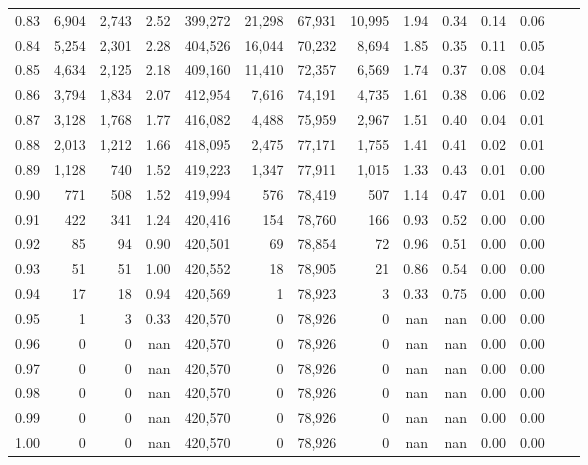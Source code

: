 \begin{tabular}{rrrrrrrrrrrrrr}
0.83 &   6,904 &  2,743 &    2.52 &  399,272 &   21,298 &  67,931 &  10,995 &  1.94 &  0.34 &  0.14 &      0.06 \\
0.84 &   5,254 &  2,301 &    2.28 &  404,526 &   16,044 &  70,232 &   8,694 &  1.85 &  0.35 &  0.11 &      0.05 \\
0.85 &   4,634 &  2,125 &    2.18 &  409,160 &   11,410 &  72,357 &   6,569 &  1.74 &  0.37 &  0.08 &      0.04 \\
0.86 &   3,794 &  1,834 &    2.07 &  412,954 &    7,616 &  74,191 &   4,735 &  1.61 &  0.38 &  0.06 &      0.02 \\
0.87 &   3,128 &  1,768 &    1.77 &  416,082 &    4,488 &  75,959 &   2,967 &  1.51 &  0.40 &  0.04 &      0.01 \\
0.88 &   2,013 &  1,212 &    1.66 &  418,095 &    2,475 &  77,171 &   1,755 &  1.41 &  0.41 &  0.02 &      0.01 \\
0.89 &   1,128 &    740 &    1.52 &  419,223 &    1,347 &  77,911 &   1,015 &  1.33 &  0.43 &  0.01 &      0.00 \\
0.90 &     771 &    508 &    1.52 &  419,994 &      576 &  78,419 &     507 &  1.14 &  0.47 &  0.01 &      0.00 \\
0.91 &     422 &    341 &    1.24 &  420,416 &      154 &  78,760 &     166 &  0.93 &  0.52 &  0.00 &      0.00 \\
0.92 &      85 &     94 &    0.90 &  420,501 &       69 &  78,854 &      72 &  0.96 &  0.51 &  0.00 &      0.00 \\
0.93 &      51 &     51 &    1.00 &  420,552 &       18 &  78,905 &      21 &  0.86 &  0.54 &  0.00 &      0.00 \\
0.94 &      17 &     18 &    0.94 &  420,569 &        1 &  78,923 &       3 &  0.33 &  0.75 &  0.00 &      0.00 \\
0.95 &       1 &      3 &    0.33 &  420,570 &        0 &  78,926 &       0 &   nan &   nan &  0.00 &      0.00 \\
0.96 &       0 &      0 &     nan &  420,570 &        0 &  78,926 &       0 &   nan &   nan &  0.00 &      0.00 \\
0.97 &       0 &      0 &     nan &  420,570 &        0 &  78,926 &       0 &   nan &   nan &  0.00 &      0.00 \\
0.98 &       0 &      0 &     nan &  420,570 &        0 &  78,926 &       0 &   nan &   nan &  0.00 &      0.00 \\
0.99 &       0 &      0 &     nan &  420,570 &        0 &  78,926 &       0 &   nan &   nan &  0.00 &      0.00 \\
1.00 &       0 &      0 &     nan &  420,570 &        0 &  78,926 &       0 &   nan &   nan &  0.00 &      0.00 \\
\bottomrule
\end{tabular}
